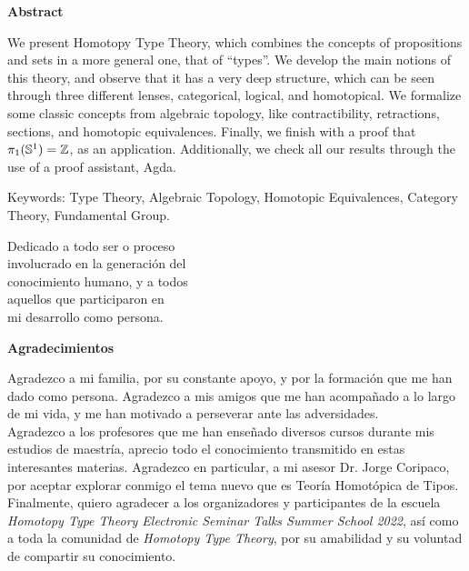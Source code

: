 \documentclass[12pt]{report}
\theoremstyle{definition}
\theoremstyle{plain}
\newenvironment{dedication}
  {\clearpage           %
   \thispagestyle{empty}%
   \vspace*{\stretch{1}}%
   \itshape             %
   \raggedleft          %
  }
  {\par %
   \vspace{\stretch{3}} %
   \clearpage           %
  }
\begin{document}
\begin{center}
    \textbf{Abstract}\\[1cm]
\end{center}

\noindent We present Homotopy Type Theory, which combines the concepts of propositions and sets in a more general one, that of ``types''.
We develop the main notions of this theory, and observe that it has a very deep structure, which can be seen through three different lenses, categorical, logical, and homotopical.
We formalize some classic concepts from algebraic topology, like contractibility, retractions, sections, and homotopic equivalences.
Finally, we finish with a proof that $\pi_1(\mathbb{S}^1)=\mathbb{Z}$, as an application.
Additionally, we check all our results through the use of a proof assistant, Agda.

\vspace{1cm}
\noindent Keywords: Type Theory, Algebraic Topology, Homotopic Equivalences, Category Theory, Fundamental Group.


\newpage
{}
\begin{dedication}
    Dedicado a todo ser o proceso \\
    involucrado en la generaci\'on del \\
    conocimiento humano, y a todos \\
    aquellos que participaron en \\
    mi desarrollo como persona.
\end{dedication}


\newpage
{}
\begin{center}
    \vspace{1cm}
    \textbf{Agradecimientos} \\[0.6cm]
\end{center}
Agradezco a mi familia, por su constante apoyo, y por la formaci\'on que me han dado como persona.
Agradezco a mis amigos que me han acompa\~nado a lo largo de mi vida, y me han motivado a perseverar ante las adversidades.  \\[0.3cm]
Agradezco a los profesores que me han ense\~nado diversos cursos durante mis estudios de maestr\'ia, aprecio todo el conocimiento transmitido en estas interesantes materias.
Agradezco en particular, a mi asesor Dr. Jorge Coripaco, por aceptar explorar conmigo el tema nuevo que es Teor\'ia Homot\'opica de Tipos. \\[0.3cm]
Finalmente, quiero agradecer a los organizadores y participantes de la escuela \textit{Homotopy Type Theory Electronic Seminar Talks Summer School 2022}, as\'i como a toda la comunidad de \textit{Homotopy Type Theory}, por su amabilidad y su voluntad de compartir su conocimiento.
\end{document}
